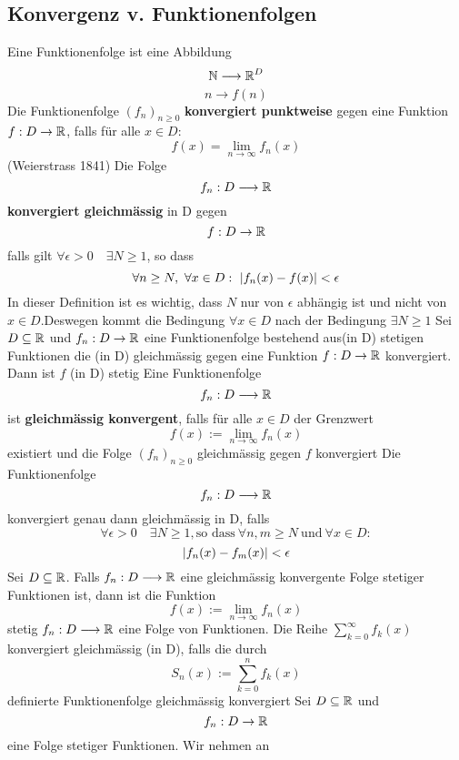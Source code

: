\subsection{Konvergenz v. Funktionenfolgen}
Eine Funktionenfolge ist eine Abbildung 
\[ \mathbb{N} \longrightarrow \mathbb{R}^D\]
\[ n \longrightarrow f(n)\]
\Def[3.30] Die Funktionenfolge \((f_n)_{n \geq 0}\) \textbf{konvergiert punktweise} gegen eine Funktion \(f: D \rightarrow \mathbb{R}\), falls für alle \(x \in D :\)
\[f(x) = \lim\limits_{n \rightarrow \infty}f_n(x)\]
\Def[3.32] (Weierstrass 1841) Die Folge
\[f_n : D \longrightarrow \mathbb{R} \]
\textbf{konvergiert gleichmässig} in D gegen
\[f : D  \rightarrow \mathbb{R}\]
falls gilt \( \forall \epsilon > 0 \quad \exists N \geq 1\), so dass
\[\forall n \geq N,\  \forall x \in D :\  \left\lvert f_n(x) - f(x)  \right\rvert < \epsilon \] \newline
In dieser Definition ist es wichtig, dass \(N\) nur von \( \epsilon\) abhängig ist und nicht von \(x \in D\).Deswegen kommt die Bedingung \(\forall x \in D\) nach der Bedingung \(\exists N \geq 1\)
\Satz[3.33] Sei \(D \subseteq \mathbb{R}\) und \(f_n : D \rightarrow \mathbb{R} \) eine Funktionenfolge bestehend aus(in D) stetigen Funktionen die (in D) gleichmässig gegen eine Funktion \(f: D \rightarrow \mathbb{R} \) konvergiert. Dann ist \(f\) (in D) stetig \newline
\Def[3.34] Eine Funktionenfolge
\[f_n : D \longrightarrow \mathbb{R}\]
ist \textbf{gleichmässig konvergent}, falls für alle \(x \in D\) der Grenzwert
\[f(x) := \lim\limits_{n \rightarrow \infty} f_n(x)\]
existiert und die Folge \((f_n)_{n \geq 0}\) gleichmässig gegen \(f\) konvergiert \newline
\Korollar[3.35] Die Funktionenfolge
\[f_n : D \longrightarrow \mathbb{R} \]
konvergiert genau dann gleichmässig in D, falls
\[\forall \epsilon > 0 \quad \exists N \geq 1 , \text{so dass} \  \forall n,m \geq N \ \text{und} \ \forall x \in D:\]  \newline
\[ \left\lvert f_n(x) - f_m(x) \right\rvert < \epsilon \]
\Korollar[3.36] Sei \(D \subseteq \mathbb{R}\). Falls \(f_n : D \longrightarrow \mathbb{R} \) eine gleichmässig konvergente Folge stetiger Funktionen ist, dann ist die Funktion
\[f(x) := \lim\limits_{n \rightarrow \infty} f_n(x)\] stetig \newline
\Def[3.37] \(f_n: D \longrightarrow \mathbb{R}\) eine Folge von Funktionen. Die Reihe \(\sum_{k=0}^\infty f_k(x)\) konvergiert gleichmässig (in D), falls die durch
\[S_n(x) := \sum_{k=0}^{n}f_k(x)\] definierte Funktionenfolge gleichmässig konvergiert
\Satz[3.38] Sei \(D \subseteq \mathbb{R} \) und
\[f_n : D \rightarrow \mathbb{R} \]
eine Folge stetiger Funktionen. Wir nehmen an
